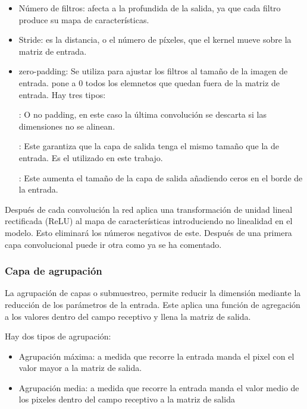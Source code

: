 \begin{itemize}
	\item{Número de filtros}: afecta a la profundida de la salida, ya que cada filtro produce su mapa de características.
	
	\item{Stride}: es la distancia,  o el número de píxeles, que el kernel mueve sobre la matriz de entrada.
	
	\item{zero-padding}: Se utiliza para ajustar los filtros al tamaño de la imagen de entrada.
	pone a 0 todos los elemnetos que quedan fuera de la matriz de entrada. Hay tres tipos:
	
	: O no padding, en este caso la última convolución se descarta si las dimensiones no se alinean.
	
	: Este garantiza que la capa de salida tenga el mismo tamaño que la de entrada. Es el utilizado en este trabajo.
	
	: Este aumenta el tamaño de la capa de salida añadiendo ceros en el borde de la entrada.
	
\end{itemize}

Después de cada convolución la red aplica una transformación de unidad lineal rectificada (ReLU) al mapa de características introduciendo no linealidad en el modelo. Esto eliminará los números negativos de este.
Después de una primera capa convolucional puede ir otra como ya se ha comentado.

\subsubsection{Capa de agrupación}
La agrupación de capas o submuestreo, permite reducir la dimensión mediante la reducción de los parámetros de la entrada. Este aplica una función de agregación a los valores dentro del campo receptivo y llena la matriz de salida.

Hay dos tipos de agrupación:
\begin{itemize}
	\item{Agrupación máxima}: a medida que recorre la entrada manda el pixel con el valor mayor a la matriz de salida.
	\item{Agrupación media}: a medida que recorre la entrada manda el valor medio de los pixeles dentro del campo receptivo a la matriz de salida
\end{itemize}

